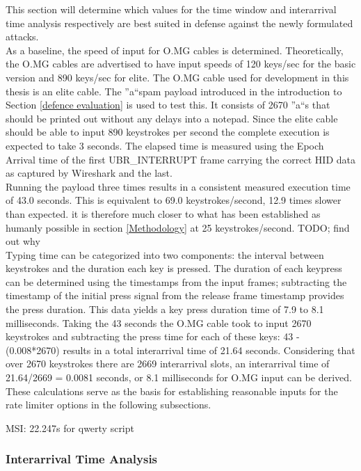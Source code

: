This section will determine which values for the time window and interarrival time analysis respectively are best suited in defense against the newly formulated attacks.\\
As a baseline, the speed of input for O.MG cables is determined. Theoretically, the O.MG cables are advertised to have input speeds of 120 keys/sec for the basic version and 890 keys/sec for elite. The O.MG cable used for development in this thesis is an elite cable. The ''a``spam payload introduced in the introduction to Section \ref{defence evaluation} is used to test this. It consists of 2670 ''a``s that should be printed out without any delays into a notepad. Since the elite cable should be able to input 890 keystrokes per second the complete execution is expected to take 3 seconds. The elapsed time is measured using the Epoch Arrival time of the first UBR\_INTERRUPT frame carrying the correct HID data as captured by Wireshark and the last. \\
Running the payload three times results in a consistent measured execution time of 43.0 seconds. This is equivalent to 69.0 keystrokes/second, 12.9 times slower than expected. it is therefore much closer to what has been established as humanly possible in section \ref{Methodology} at 25 keystrokes/second. TODO; find out why \\
Typing time can be categorized into two components: the interval between keystrokes and the duration each key is pressed. The duration of each keypress can be determined using the timestamps from the input frames; subtracting the timestamp of the initial press signal from the release frame timestamp provides the press duration. This data yields a key press duration time of 7.9 to 8.1 milliseconds. Taking the 43 seconds the O.MG cable took to input 2670 keystrokes and subtracting the press time for each of these keys: 43 - (0.008*2670) results in a total interarrival time of 21.64 seconds. Considering that over 2670 keystrokes there are 2669 interarrival slots, an interarrival time of 21.64/2669 = 0.0081 seconds, or 8.1 milliseconds for O.MG input can be derived. These calculations serve as the basis for establishing reasonable inputs for the rate limiter options in the following subsections.  


MSI: 22.247s for qwerty script

\subsubsection{Interarrival Time Analysis}


